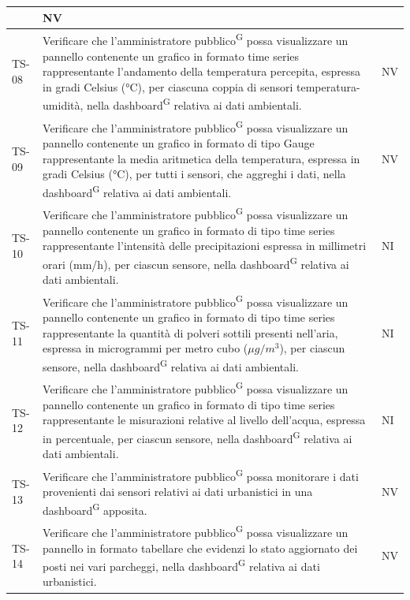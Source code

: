 \documentclass[8pt]{article}
\newcommand{\glossterm}[1]{#1\textsuperscript{G}} %
\begin{document}
\begin{longtable}{|>{\centering}p{2cm}|>{\RaggedRight}m{12cm}|>{\centering\arraybackslash}p{2cm}|}
    & NV \\
    \hline 
    TS-08 & Verificare che l’\glossterm{amministratore pubblico} possa visualizzare un pannello
    contenente un grafico in formato time series rappresentante l'andamento della temperatura
    percepita,
    espressa in gradi Celsius (°C), per ciascuna coppia di sensori temperatura-umidità, nella
    \glossterm{dashboard} relativa ai dati ambientali.
    & NV \\
    \hline
    TS-09 & Verificare che l’\glossterm{amministratore pubblico} possa visualizzare un pannello contenente
    un grafico in formato di tipo Gauge rappresentante la media aritmetica della temperatura,
    espressa in gradi Celsius (°C), per tutti i sensori, che aggreghi i dati, nella \glossterm{dashboard} relativa ai dati ambientali.
    & NV \\
    \hline
    TS-10 & Verificare che l’\glossterm{amministratore pubblico} possa visualizzare un pannello contenente
    un grafico in formato di tipo time series rappresentante l'intensità delle precipitazioni
    espressa in millimetri orari (mm/h), per ciascun sensore, nella \glossterm{dashboard} relativa ai dati ambientali.
    & NI \\
    \hline
    TS-11 & Verificare che l’\glossterm{amministratore pubblico} possa visualizzare un pannello contenente
    un grafico in formato di tipo time series rappresentante la quantità di polveri sottili presenti nell'aria,
    espressa in microgrammi per metro cubo ($\mu g / m^3$), per ciascun sensore, nella \glossterm{dashboard} relativa ai dati ambientali.
    & NI \\
    \hline
    TS-12 & Verificare che l’\glossterm{amministratore pubblico} possa visualizzare un pannello contenente
    un grafico in formato di tipo time series rappresentante le misurazioni relative al livello dell'acqua,
    espressa in percentuale, per ciascun sensore, nella \glossterm{dashboard} relativa ai dati ambientali.
    & NI \\
    \hline
    TS-13 & Verificare che l’\glossterm{amministratore pubblico} possa monitorare i dati provenienti
    dai sensori relativi ai dati urbanistici in una \glossterm{dashboard} apposita.
    & NV \\
    \hline
    TS-14 & Verificare che l’\glossterm{amministratore pubblico} possa visualizzare un pannello in formato tabellare che evidenzi lo stato aggiornato dei posti nei vari parcheggi, nella
    \glossterm{dashboard} relativa ai dati urbanistici. & NV \\

\end{longtable}
\end{document}
